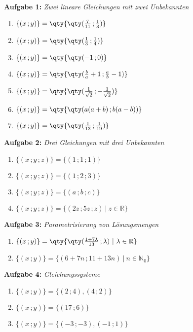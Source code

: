 
\textbf{Aufgabe 1: } \emph{Zwei lineare Gleichungen mit zwei Unbekannten}
\begin{enumerate}[label=(\alph*)]
    \item $\{(x\,;y)\} = \qty{\qty(\frac{7}{11}\,;\frac{1}{3})}$
    \item $\{(x\,;y)\} = \qty{\qty(\frac{1}{3}\,;\frac{1}{4})}$
    \item $\{(x\,;y)\} = \qty{\qty(-1\,;0)}$
    \item $\{(x\,;y)\} = \qty{\qty(\frac{b}{a}+1\,;\frac{a}{b}-1)}$
    \item $\{(x\,;y)\} = \qty{\qty(\frac{1}{\sqrt{2}}\,;-\frac{1}{\sqrt{2}})}$
    \item $\{(x\,;y)\} = \qty{\qty(a(a+b)\,;b(a-b))}$
    \item $\{(x\,;y)\} = \qty{\qty(\frac{1}{13}\,;\frac{1}{19})}$
\end{enumerate}
\vspace{0.7cm}
%
\textbf{Aufgabe 2: } \emph{Drei Gleichungen mit drei Unbekannten}
\begin{enumerate}[label=(\alph*)]
\item $\{(x\,;y\,;z)\} = \{(1\,;1\,;1)\}$
\item $\{(x\,;y\,;z)\} = \{(1\,;2\,;3)\}$
\item $\{(x\,;y\,;z)\} = \{(a\,;b\,;c)\}$
\item $\{(x\,;y\,;z)\} = \{(2z\,;5z\,;z)\ |\ z\in\mathbb{R}\}$
\end{enumerate}
\vspace{0.7cm}
%
\textbf{Aufgabe 3: } \emph{Parametrisierung von Lösungsmengen}
\begin{enumerate}[label=(\alph*)]
\item $\{(x\,;y)\} = \qty{\qty(\frac{1+7\lambda}{13}\,;\lambda)\ |\ \lambda\in\mathbb{R}}$
\item $\{(x\,;y)\} = \{(6+7n\,;11+13n)\ |\ n\in\mathbb{N}_0\}$
\end{enumerate}
\vspace{0.7cm}

\textbf{Aufgabe 4: } \emph{Gleichungssysteme}
\begin{enumerate}[label=(\alph*)]
\item $\{(x\,;y)\}=\{(2\,;4),(4\,;2)\}$
\item $\{(x\,;y)\}=\{(17\,;6)\}$
\item $\{(x\,;y)\}=\{(-3\,;-3),(-1\,;1)\}$
\end{enumerate}
\vspace{0.7cm}

